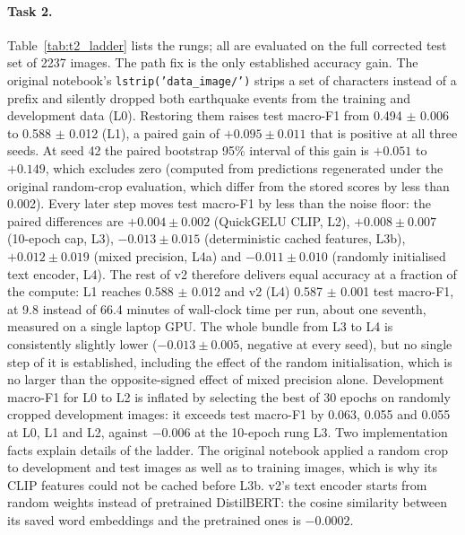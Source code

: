 \paragraph{Task 2.}
Table~\ref{tab:t2_ladder} lists the rungs; all are evaluated on the full corrected test set of 2237 images.
The path fix is the only established accuracy gain.
The original notebook's \texttt{lstrip('data\_image/')} strips a set of characters instead of a prefix and silently dropped both earthquake events from the training and development data (L0).
Restoring them raises test macro-F1 from 0.494 $\pm$ 0.006 to 0.588 $\pm$ 0.012 (L1), a paired gain of $+0.095 \pm 0.011$ that is positive at all three seeds.
At seed 42 the paired bootstrap 95\% interval of this gain is $+0.051$ to $+0.149$, which excludes zero (computed from predictions regenerated under the original random-crop evaluation, which differ from the stored scores by less than 0.002).
Every later step moves test macro-F1 by less than the noise floor: the paired differences are $+0.004 \pm 0.002$ (QuickGELU CLIP, L2), $+0.008 \pm 0.007$ (10-epoch cap, L3), $-0.013 \pm 0.015$ (deterministic cached features, L3b), $+0.012 \pm 0.019$ (mixed precision, L4a) and $-0.011 \pm 0.010$ (randomly initialised text encoder, L4).
The rest of v2 therefore delivers equal accuracy at a fraction of the compute: L1 reaches 0.588 $\pm$ 0.012 and v2 (L4) 0.587 $\pm$ 0.001 test macro-F1, at 9.8 instead of 66.4 minutes of wall-clock time per run, about one seventh, measured on a single laptop GPU.
The whole bundle from L3 to L4 is consistently slightly lower ($-0.013 \pm 0.005$, negative at every seed), but no single step of it is established, including the effect of the random initialisation, which is no larger than the opposite-signed effect of mixed precision alone.
Development macro-F1 for L0 to L2 is inflated by selecting the best of 30 epochs on randomly cropped development images: it exceeds test macro-F1 by 0.063, 0.055 and 0.055 at L0, L1 and L2, against $-0.006$ at the 10-epoch rung L3.
Two implementation facts explain details of the ladder.
The original notebook applied a random crop to development and test images as well as to training images, which is why its CLIP features could not be cached before L3b.
v2's text encoder starts from random weights instead of pretrained DistilBERT: the cosine similarity between its saved word embeddings and the pretrained ones is $-0.0002$.

